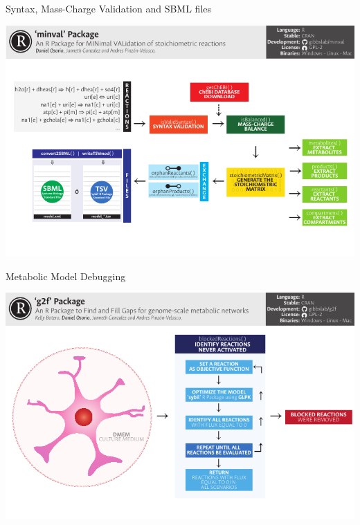 \documentclass[11pt]{beamer}
\begin{document}
\begin{frame}{Syntax, Mass-Charge Validation and SBML files}
\begin{center}
\includegraphics[width=\textwidth]{minval}
\end{center}
\end{frame}
\begin{frame}{Metabolic Model Debugging}
\begin{center}
\includegraphics[width=\textwidth]{Debug}
\end{center}
\end{frame}
\end{document}
